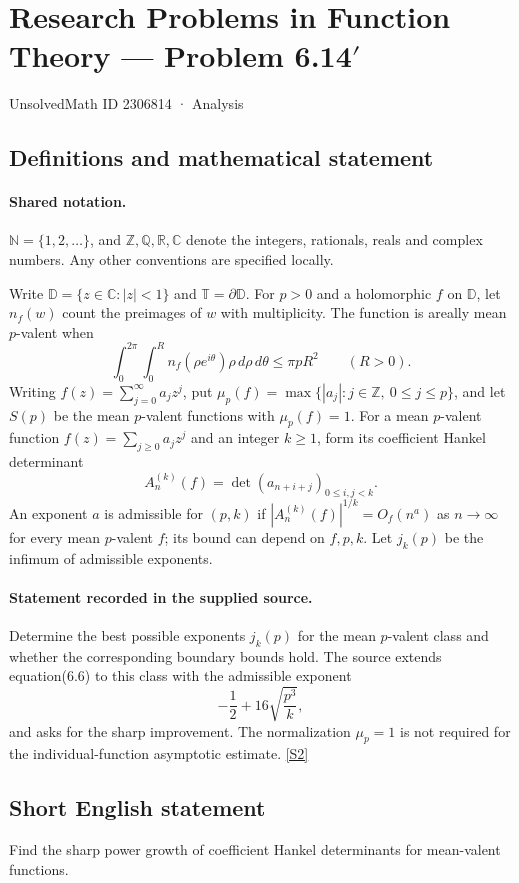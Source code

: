 \documentclass[11pt]{article}
\newcommand{\sref}[2]{\hyperlink{source:#1:#2}{[S#2]}}
\begin{document}
\setcounter{section}{2306813}
\section{Research Problems in Function Theory — Problem 6.14$\prime$}\label{2306814}
{\small\sffamily UnsolvedMath ID 2306814 · Analysis}
\subsection{Definitions and mathematical statement}

\paragraph{Shared notation.}$\mathbb N=\{1,2,\ldots\}$, and $\mathbb Z,\mathbb Q,\mathbb R,\mathbb C$ denote the integers, rationals, reals and complex numbers. Any other conventions are specified locally.


Write $\mathbb D=\{z\in\mathbb C:|z|<1\}$ and $\mathbb T=\partial\mathbb D$. For $p>0$ and a holomorphic $f$ on $\mathbb D$, let $n_f(w)$ count the preimages of $w$ with multiplicity. The function is areally mean $p$-valent when
\[\int_0^{2\pi}\int_0^R n_f(\rho e^{i\theta})\rho\,d\rho\,d\theta\leq\pi pR^2\qquad(R>0).\]
Writing $f(z)=\sum_{j=0}^{\infty}a_jz^j$, put $\mu_p(f)=\max\{|a_j|:j\in\mathbb Z,\ 0\leq j\leq p\}$, and let $S(p)$ be the mean $p$-valent functions with $\mu_p(f)=1$.
For a mean $p$-valent function $f(z)=\sum_{j\geq0}a_jz^j$ and an integer $k\geq1$, form its coefficient Hankel determinant
\[A_n^{(k)}(f)=\det(a_{n+i+j})_{0\leq i,j<k}.\]
An exponent $a$ is admissible for $(p,k)$ if $|A_n^{(k)}(f)|^{1/k}=O_f(n^a)$ as $n\to\infty$ for every mean $p$-valent $f$; its bound can depend on $f,p,k$. Let $j_k(p)$ be the infimum of admissible exponents.
\paragraph{Statement recorded in the supplied source.}
Determine the best possible exponents $j_k(p)$ for the mean $p$-valent class and whether the corresponding boundary bounds hold. The source extends equation(6.6) to this class with the admissible exponent
\[-\frac12+16\sqrt{\frac{p^3}{k}},\]
and asks for the sharp improvement. The normalization $\mu_p=1$ is not required for the individual-function asymptotic estimate. \sref{2306814}{2}
\subsection{Short English statement}
Find the sharp power growth of coefficient Hankel determinants for mean-valent functions.
\end{document}
